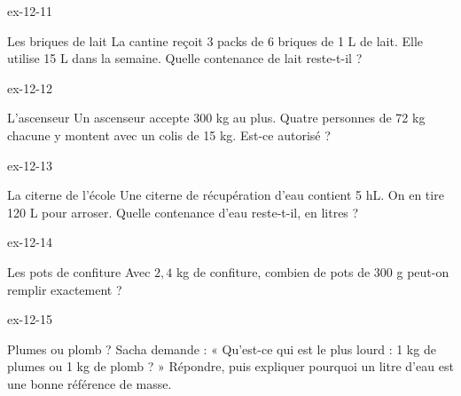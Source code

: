 \begin{blocLivre}{ex-12-11}\begin{exercice}[3]{Les briques de lait}
La cantine reçoit 3 packs de 6 briques de 1 L de lait. Elle utilise 15 L dans la semaine. Quelle contenance de lait reste-t-il ?
\end{exercice}\end{blocLivre}
\begin{blocLivre}{ex-12-12}\begin{exercice}[3]{L’ascenseur}
Un ascenseur accepte 300 kg au plus. Quatre personnes de 72 kg chacune y montent avec un colis de 15 kg. Est-ce autorisé ?
\end{exercice}\end{blocLivre}
\begin{blocLivre}{ex-12-13}\begin{exercice}[3]{La citerne de l’école}
Une citerne de récupération d’eau contient 5 hL. On en tire 120 L pour arroser. Quelle contenance d’eau reste-t-il, en litres ?
\end{exercice}\end{blocLivre}
\begin{blocLivre}{ex-12-14}\begin{exercice}[3]{Les pots de confiture}
Avec $2{,}4$ kg de confiture, combien de pots de 300 g peut-on remplir exactement ?
\end{exercice}\end{blocLivre}
\begin{blocLivre}{ex-12-15}\begin{exercice}[3]{Plumes ou plomb ?}
Sacha demande : « Qu’est-ce qui est le plus lourd : 1 kg de plumes ou 1 kg de plomb ? » Répondre, puis expliquer pourquoi un litre d’eau est une bonne référence de masse.
\end{exercice}\end{blocLivre}

\clearpage
